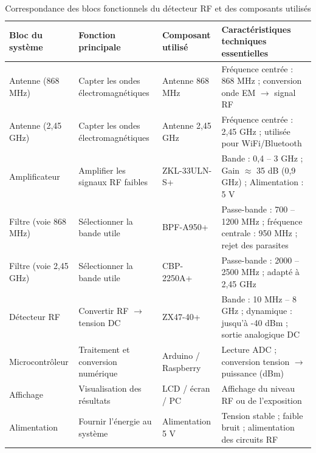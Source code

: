 \documentclass[12pt,a4paper]{article}
\begin{document}
\begin{table}[H]
\centering
\renewcommand{\arraystretch}{1.4}
\begin{tabular}{|p{3cm}|p{4cm}|p{3cm}|p{5cm}|}
\hline
\textbf{Bloc du système} & \textbf{Fonction principale} & \textbf{Composant utilisé} & \textbf{Caractéristiques \;techniques essentielles} \\
\hline

Antenne (868 MHz) & Capter les ondes électromagnétiques & Antenne 868 MHz & Fréquence centrée : 868 MHz ; conversion onde EM $\rightarrow$ signal RF \\
\hline

Antenne (2,45 GHz) & Capter les ondes électromagnétiques & Antenne 2,45 GHz & Fréquence centrée : 2,45 GHz ; utilisée pour WiFi/Bluetooth \\
\hline

Amplificateur & Amplifier les signaux RF faibles & ZKL-33ULN-S+ & Bande : 0,4 -- 3 GHz ; Gain $\approx$ 35 dB (0,9 GHz) ; Alimentation : 5 V \\
\hline

Filtre (voie 868 MHz) & Sélectionner la bande utile & BPF-A950+ & Passe-bande : 700 -- 1200 MHz ; fréquence centrale : 950 MHz ; rejet des parasites \\
\hline

Filtre (voie 2,45 GHz) & Sélectionner la bande utile & CBP-2250A+ & Passe-bande : 2000 -- 2500 MHz ; adapté à 2,45 GHz \\
\hline

Détecteur RF & Convertir RF $\rightarrow$ tension DC & ZX47-40+ & Bande : 10 MHz -- 8 GHz ; dynamique : jusqu'à -40 dBm ; sortie analogique DC \\
\hline

Microcontrôleur & Traitement et conversion numérique & Arduino / Raspberry & Lecture ADC ; conversion tension $\rightarrow$ puissance (dBm) \\
\hline

Affichage & Visualisation des résultats & LCD / écran / PC & Affichage du niveau RF ou de l’exposition \\
\hline

Alimentation & Fournir l’énergie au système & Alimentation 5 V & Tension stable ; faible bruit ; alimentation des circuits RF \\
\hline

\end{tabular}
\caption{Correspondance des blocs fonctionnels du détecteur RF et des composants utilisés}
\end{table}
\end{document}
